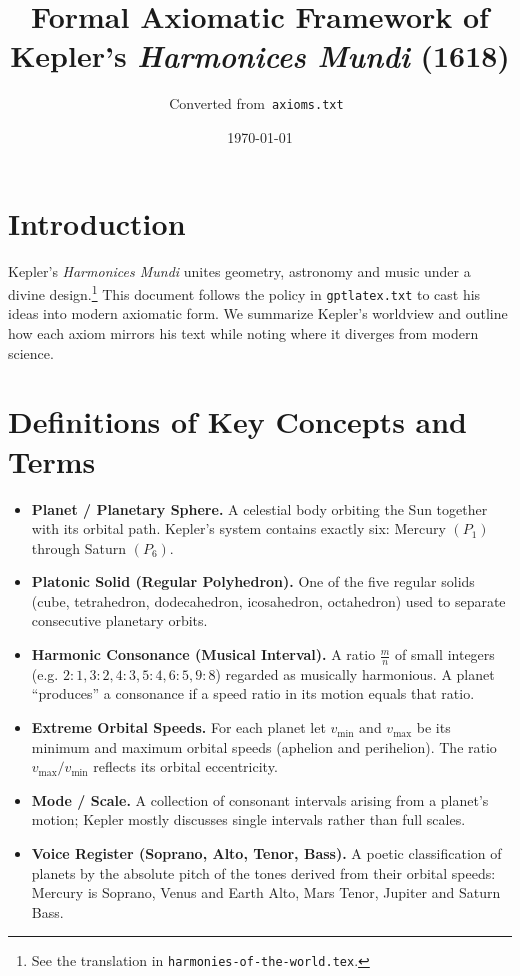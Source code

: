 \documentclass[11pt]{article}
\title{\Huge\bfseries Formal Axiomatic Framework of Kepler's \emph{Harmonices Mundi} (1618)}
\author{Converted from\texttt{ axioms.txt }}
\date{\today}
\begin{document}
\maketitle

\section*{Introduction}
Kepler's \emph{Harmonices Mundi} unites geometry, astronomy and music under a divine design.\footnote{See the translation in \texttt{harmonies-of-the-world.tex}.} This document follows the policy in \texttt{gptlatex.txt} to cast his ideas into modern axiomatic form.  We summarize Kepler's worldview and outline how each axiom mirrors his text while noting where it diverges from modern science.

\section*{Definitions of Key Concepts and Terms}
\begin{itemize}
  \item \textbf{Planet / Planetary Sphere.} A celestial body orbiting the Sun together with its orbital path.  Kepler's system contains exactly six: Mercury $(P_1)$ through Saturn $(P_6)$.
  \item \textbf{Platonic Solid (Regular Polyhedron).} One of the five regular solids (cube, tetrahedron, dodecahedron, icosahedron, octahedron) used to separate consecutive planetary orbits.
  \item \textbf{Harmonic Consonance (Musical Interval).} A ratio $\tfrac{m}{n}$ of small integers (e.g. $2{:}1,3{:}2,4{:}3,5{:}4,6{:}5,9{:}8$) regarded as musically harmonious.  A planet ``produces'' a consonance if a speed ratio in its motion equals that ratio.
  \item \textbf{Extreme Orbital Speeds.} For each planet let $v_{\min}$ and $v_{\max}$ be its minimum and maximum orbital speeds (aphelion and perihelion).  The ratio $v_{\max}/v_{\min}$ reflects its orbital eccentricity.
  \item \textbf{Mode / Scale.}  A collection of consonant intervals arising from a planet's motion; Kepler mostly discusses single intervals rather than full scales.
  \item \textbf{Voice Register (Soprano, Alto, Tenor, Bass).}  A poetic classification of planets by the absolute pitch of the tones derived from their orbital speeds: Mercury is Soprano, Venus and Earth Alto, Mars Tenor, Jupiter and Saturn Bass.
\end{itemize}
\end{document}
